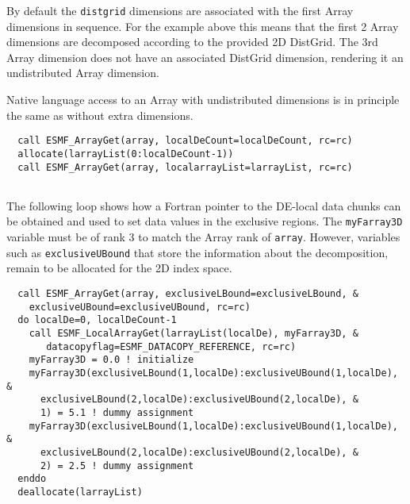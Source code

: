    By default the {\tt distgrid} dimensions are associated
   with the first Array dimensions in sequence. For the example above this means
   that the first 2 Array dimensions are decomposed according to the provided 2D
   DistGrid. The 3rd Array dimension does not have an associated DistGrid
   dimension, rendering it an undistributed Array dimension.
  
   Native language access to an Array with undistributed dimensions is in
   principle the same as without extra dimensions. 

 \begin{verbatim}
  call ESMF_ArrayGet(array, localDeCount=localDeCount, rc=rc)
  allocate(larrayList(0:localDeCount-1))
  call ESMF_ArrayGet(array, localarrayList=larrayList, rc=rc)
 
\end{verbatim}
 

   The following loop shows how a Fortran pointer to the DE-local data chunks
   can be obtained and used to set data values in the exclusive regions. The
   {\tt myFarray3D} variable must be of rank 3 to match the Array rank of
   {\tt array}. However, variables such as {\tt exclusiveUBound} that store the
   information about the decomposition, remain to be allocated for the 2D 
   index space. 

 \begin{verbatim}
  call ESMF_ArrayGet(array, exclusiveLBound=exclusiveLBound, &
    exclusiveUBound=exclusiveUBound, rc=rc)
  do localDe=0, localDeCount-1
    call ESMF_LocalArrayGet(larrayList(localDe), myFarray3D, &
       datacopyflag=ESMF_DATACOPY_REFERENCE, rc=rc)
    myFarray3D = 0.0 ! initialize
    myFarray3D(exclusiveLBound(1,localDe):exclusiveUBound(1,localDe), &
      exclusiveLBound(2,localDe):exclusiveUBound(2,localDe), &
      1) = 5.1 ! dummy assignment
    myFarray3D(exclusiveLBound(1,localDe):exclusiveUBound(1,localDe), &
      exclusiveLBound(2,localDe):exclusiveUBound(2,localDe), &
      2) = 2.5 ! dummy assignment
  enddo
  deallocate(larrayList)
 
\end{verbatim}
 

